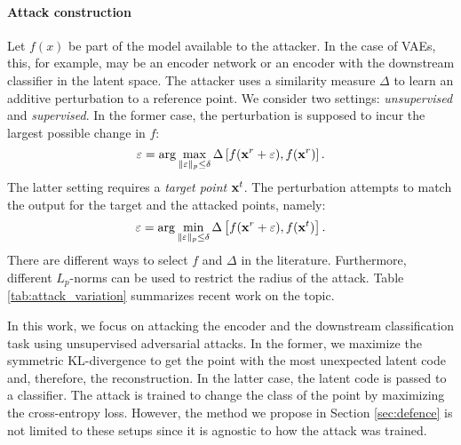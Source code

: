 \paragraph{Attack construction} 
Let $f(x)$ be part of the model available to the attacker. In the case of VAEs, this, for example, may be an encoder network or an encoder with the downstream classifier in the latent space. The attacker uses a similarity measure $\Delta$ to learn an additive perturbation to a reference point. We consider two settings: \textit{unsupervised} and \textit{supervised}. In the former case, the perturbation is supposed to incur the largest possible change in $f$:
\begin{equation}\label{eq:objective_unsup}
    \varepsilon = \arg\max_{\|\varepsilon\|_p \leq \delta }\Delta\left[f(\rvx^r + \varepsilon) , f(\rvx^r) \right].
\end{equation}
The latter setting requires a \textit{target point} ${\mathbf{x}}^t$. The perturbation attempts to match the output for the target and the attacked points, namely:
\begin{equation}\label{eq:objective_sup}
    \varepsilon = \arg\min_{\|\varepsilon\|_p \leq \delta }\Delta\left[ f(\rvx^r + \varepsilon), f(\rvx^t) \right].
\end{equation}
There are different ways to select $f$ and $\Delta$ in the literature. Furthermore, different $L_p$-norms can be used to restrict the radius of the attack. Table \ref{tab:attack_variation} summarizes recent work on the topic. %

In this work, we focus on attacking the encoder and the downstream classification task using unsupervised adversarial attacks. 
In the former, we maximize the symmetric KL-divergence to get the point with the most unexpected latent code and, therefore, the reconstruction. In the latter case, the latent code is passed to a classifier. The attack is trained to change the class of the point by maximizing the cross-entropy loss. However, the method we propose in Section \ref{sec:defence} is not limited to these setups since it is agnostic to how the attack was trained. 

